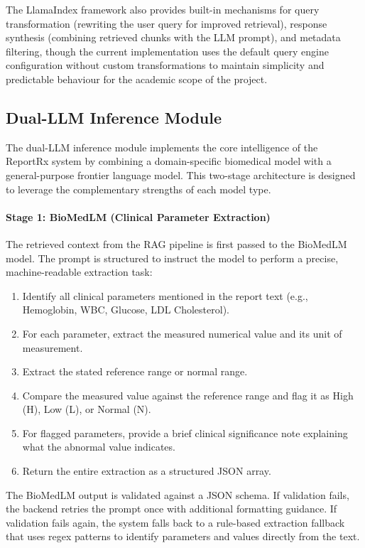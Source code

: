 The LlamaIndex framework also provides built-in mechanisms for query transformation (rewriting the user query for improved retrieval), response synthesis (combining retrieved chunks with the LLM prompt), and metadata filtering, though the current implementation uses the default query engine configuration without custom transformations to maintain simplicity and predictable behaviour for the academic scope of the project.

\subsection{Dual-LLM Inference Module}
The dual-LLM inference module implements the core intelligence of the ReportRx system by combining a domain-specific biomedical model with a general-purpose frontier language model. This two-stage architecture is designed to leverage the complementary strengths of each model type.

\paragraph{Stage 1: BioMedLM (Clinical Parameter Extraction)}
The retrieved context from the RAG pipeline is first passed to the BioMedLM model. The prompt is structured to instruct the model to perform a precise, machine-readable extraction task:

\begin{enumerate}
    \item Identify all clinical parameters mentioned in the report text (e.g., Hemoglobin, WBC, Glucose, LDL Cholesterol).
    \item For each parameter, extract the measured numerical value and its unit of measurement.
    \item Extract the stated reference range or normal range.
    \item Compare the measured value against the reference range and flag it as High (H), Low (L), or Normal (N).
    \item For flagged parameters, provide a brief clinical significance note explaining what the abnormal value indicates.
    \item Return the entire extraction as a structured JSON array.
\end{enumerate}

The BioMedLM output is validated against a JSON schema. If validation fails, the backend retries the prompt once with additional formatting guidance. If validation fails again, the system falls back to a rule-based extraction fallback that uses regex patterns to identify parameters and values directly from the text.


